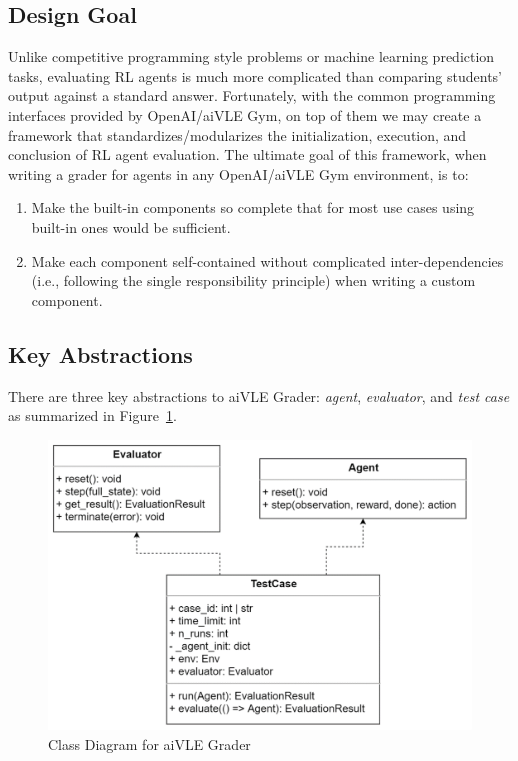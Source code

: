 \subsection{Design Goal}
Unlike competitive programming style problems or machine learning prediction tasks, evaluating RL agents is much more complicated than comparing students’ output against a standard answer. Fortunately, with the common programming interfaces provided by OpenAI/aiVLE Gym, on top of them we may create a framework that standardizes/modularizes the initialization, execution, and conclusion of RL agent evaluation. The ultimate goal of this framework, when writing a grader for agents in any OpenAI/aiVLE Gym environment, is to:
\begin{enumerate}
    \item Make the built-in components so complete that for most use cases using built-in ones would be sufficient.
    \item Make each component self-contained without complicated inter-dependencies (i.e., following the single responsibility principle) when writing a custom component.
\end{enumerate}

\subsection{Key Abstractions}
There are three key abstractions to aiVLE Grader: \textit{agent}, \textit{evaluator}, and \textit{test case} as summarized in Figure~\ref{fig:aivle-grader-class}.

\begin{figure}[H]
    \centering
    \includegraphics{images/aivle-grader-class.png}
    \caption{Class Diagram for aiVLE Grader}
    \label{fig:aivle-grader-class}
\end{figure}

